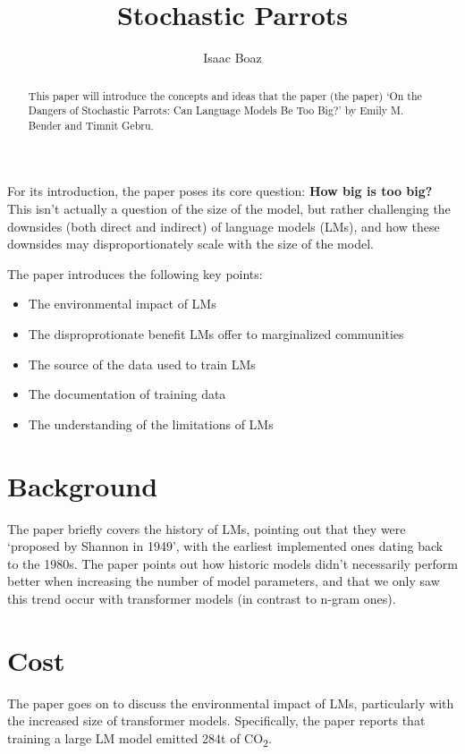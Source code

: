 \documentclass[12pt]{article}
\begin{document}
\title{Stochastic Parrots}
\author{Isaac Boaz}
\maketitle

\begin{abstract}
    This paper will introduce the concepts and ideas that the paper (the paper)
    `On the Dangers of Stochastic Parrots: Can Language Models Be Too Big?' by
    Emily M. Bender and Timnit Gebru.
\end{abstract}

For its introduction, the paper poses its core question: \textbf{How big is too
    big?} This isn't actually a question of the size of the model, but rather
challenging the downsides (both direct and indirect) of language models (LMs),
and how these downsides may disproportionately scale with the size of the model.

\begin{singlespace}
    The paper introduces the following key points:
    \begin{itemize}
        \item The environmental impact of LMs
        \item The disproprotionate benefit LMs offer to marginalized communities
        \item The source of the data used to train LMs
        \item The documentation of training data
        \item The understanding of the limitations of LMs
    \end{itemize}
\end{singlespace}

\section*{Background}
The paper briefly covers the history of LMs, pointing out that they were
`proposed by Shannon in 1949', with the earliest implemented ones dating back to
the 1980s. The paper points out how historic models didn't necessarily perform better
when increasing the number of model parameters, and that we only saw this trend
occur with transformer models (in contrast to n-gram ones).

\section*{Cost}
The paper goes on to discuss the environmental impact of LMs, particularly with
the increased size of transformer models. Specifically, the paper reports that
training a large LM model emitted 284t of CO\textsubscript{2}.
\end{document}
